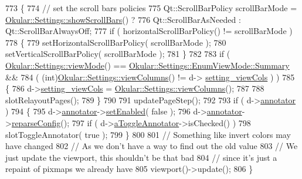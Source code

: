 \begin{DoxyCode}
773 \{
774     \textcolor{comment}{// set the scroll bars policies}
775     Qt::ScrollBarPolicy scrollBarMode = \hyperlink{classOkular_1_1Settings_ac42d4fae1c334be5db9cd30193290b04}{Okular::Settings::showScrollBars}() 
      ?
776         Qt::ScrollBarAsNeeded : Qt::ScrollBarAlwaysOff;
777     \textcolor{keywordflow}{if} ( horizontalScrollBarPolicy() != scrollBarMode )
778     \{
779         setHorizontalScrollBarPolicy( scrollBarMode );
780         setVerticalScrollBarPolicy( scrollBarMode );
781     \}
782 
783     \textcolor{keywordflow}{if} ( \hyperlink{classOkular_1_1Settings_a54872ccea98a1749bdccc6552c1aaa84}{Okular::Settings::viewMode}() == 
      \hyperlink{classOkular_1_1Settings_1_1EnumViewMode_a33bc89b0f0c02bd5539bad916569a665a6551656e4f96799c3792390290c061fb}{Okular::Settings::EnumViewMode::Summary} &&
784          ( (\textcolor{keywordtype}{int})\hyperlink{classOkular_1_1Settings_a89ff1e2d74235c7f591473a1976d343f}{Okular::Settings::viewColumns}() != d->
      \hyperlink{classPageViewPrivate_a21714496870aaec57f163f23a696da48}{setting\_viewCols} ) )
785     \{
786         d->\hyperlink{classPageViewPrivate_a21714496870aaec57f163f23a696da48}{setting\_viewCols} = \hyperlink{classOkular_1_1Settings_a89ff1e2d74235c7f591473a1976d343f}{Okular::Settings::viewColumns}();
787 
788         slotRelayoutPages();
789     \}
790 
791     updatePageStep();
792 
793     \textcolor{keywordflow}{if} ( d->\hyperlink{classPageViewPrivate_a07bad73b61f6b400411aacc7e2e820a0}{annotator} )
794     \{
795         d->\hyperlink{classPageViewPrivate_a07bad73b61f6b400411aacc7e2e820a0}{annotator}->\hyperlink{classPageViewAnnotator_a69ebe26ffe14871bacc3b8bcb7fae14b}{setEnabled}( \textcolor{keyword}{false} );
796         d->\hyperlink{classPageViewPrivate_a07bad73b61f6b400411aacc7e2e820a0}{annotator}->\hyperlink{classPageViewAnnotator_a7d1a67976c625883662731070416e4df}{reparseConfig}();
797         \textcolor{keywordflow}{if} ( d->\hyperlink{classPageViewPrivate_a29f1ef25d86a534e1605ae5e662233b8}{aToggleAnnotator}->isChecked() )
798             slotToggleAnnotator( \textcolor{keyword}{true} );
799     \}
800 
801     \textcolor{comment}{// Something like invert colors may have changed}
802     \textcolor{comment}{// As we don't have a way to find out the old value}
803     \textcolor{comment}{// We just update the viewport, this shouldn't be that bad}
804     \textcolor{comment}{// since it's just a repaint of pixmaps we already have}
805     viewport()->update();
806 \}
\end{DoxyCode}
